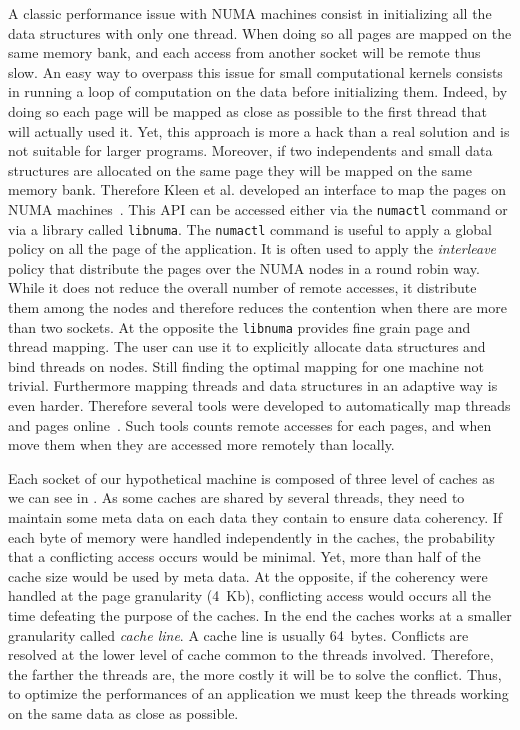 A classic performance issue with \gls{NUMA} machines consist in initializing all the data structures with only one thread.
When doing so all pages are mapped on the same memory bank, and each access from another socket will be remote thus slow.
An easy way to overpass this issue for small computational kernels consists in running a loop of computation on the data before initializing them.
Indeed, by doing so each page will be mapped as close as possible to the first thread that will actually used it.
Yet, this approach is more a hack than a real solution and is not suitable for larger programs.
Moreover, if two independents and small data structures are allocated on the same page they will be mapped on the same memory bank.
Therefore Kleen et al. developed an interface to map the pages on \gls{NUMA} machines~\cite{Kleen05NUMA}.
This \gls{API} can be accessed either via the \texttt{numactl} command or via a library called \texttt{libnuma}.
The \texttt{numactl} command is useful to apply a global policy on all the page of the application.
It is often used to apply the \emph{interleave} policy that distribute the pages over the \gls{NUMA} nodes in a round robin way.
While it does not reduce the overall number of remote accesses, it distribute them among the nodes and therefore reduces the contention when there are more than two sockets.
At the opposite the \texttt{libnuma} provides fine grain page and thread mapping.
The user can use it to explicitly allocate data structures and bind threads on nodes.
Still finding the optimal mapping for one machine not trivial.
Furthermore mapping threads and data structures in an adaptive way is even harder.
Therefore several tools were developed to automatically map threads and pages online~\cite{Diener14kMAF,Corbet12Toward}.
Such tools counts remote accesses for each pages, and when move them when they are accessed more remotely than locally.

Each socket of our hypothetical machine is composed of three level of caches as we can see in .
As some caches are shared by several threads, they need to maintain some meta data on each data they contain to ensure data coherency.
If each byte of memory were handled independently in the caches, the probability that a conflicting access occurs would be minimal.
Yet, more than half of the cache size would be used by meta data.
At the opposite, if the coherency were handled at the page granularity (\SI{4}{Kb}), conflicting access would occurs all the time defeating the purpose of the caches.
In the end the caches works at a smaller granularity called \emph{cache line}.
A cache line is usually \SI{64}{bytes}.
Conflicts are resolved at the lower level of cache common to the threads involved.
Therefore, the farther the threads are, the more costly it will be to solve the conflict.
Thus, to optimize the performances of an application we must keep the threads working on the same data as close as possible.

